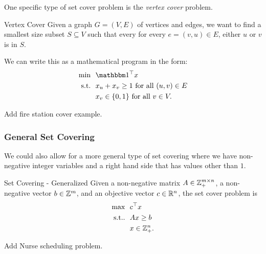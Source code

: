 \documentclass[../open-optimization/open-optimization.tex]{subfiles}
\begin{document}
One specific type of set cover problem is the \emph{vertex cover} problem.
\begin{general}{Vertex Cover}{\npcomplete}
Given a graph $G = (V,E)$ of vertices and edges, we want to find a smallest size subset $S \subseteq V$ such that every for every $e = (v,u) \in E$, either $u$ or $v$ is in $S$.   

We can write this as a mathematical program in the form:
\begin{equation}
\begin{split}
\min \ \ & \one^\top x\\
\text{s.t.} \ \ & x_u + x_v \geq 1 \text{ for all } (u,v) \in E \\ 
& x_v \in \{0,1\} \text{ for all } v \in V.
\end{split}
\end{equation}
\end{general}

\begin{todo}
Add fire station cover example.
\end{todo}








\subsubsection{General Set Covering}
We could also allow for a more general type of set covering where we have non-negative integer variables and a right hand side that has values other than $1$.
\begin{general}{Set Covering - Generalized}{\npcomplete}
\label{general:set-covering-alternate}
Given a non-negative matrix $A \in {\mathbb{Z}}_+^{m \times n}$, a non-negative vector $b \in {\mathbb{Z}}^m$, and an objective vector $c \in {\mathbb{R}}^n$, the set cover problem is
\begin{equation}
\begin{split}
\max \ \ & c^\top x\\
\text{s.t.}. \ \ & Ax \geq b \\
& x \in{\mathbb{Z}}^n_+.
\end{split}
\end{equation}
\end{general}

\begin{todo}
 Add Nurse scheduling problem.
\end{todo}
\end{document}
